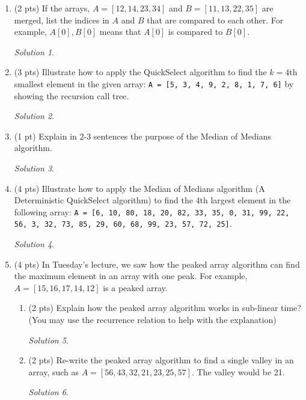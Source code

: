 \documentclass[12pt]{article}
\theoremstyle{remark}
\newtheorem*{solution}{Solution}
\begin{document}
\begin{enumerate}
\item (2 pts) If the arrays, $A=[12, 14, 23, 34]$ and $B=[11, 13, 22, 35]$ are merged, list the indices in $A$ and $B$ that are compared to each other. For example, $A[0], B[0]$ means that $A[0]$ is compared to $B[0]$.
\begin{solution}

\end{solution}

\item (3 pts) Illustrate how to apply the QuickSelect algorithm to find the $k = 4$th smallest element in the given array: \texttt{A = [5, 3, 4, 9, 2, 8, 1, 7, 6]} by showing the recursion call tree.
\begin{solution}

\end{solution}
\pagebreak
\item (1 pt) Explain in 2-3 sentences the purpose of the Median of Medians algorithm.
\begin{solution}

\end{solution}

\item (4 pts) Illustrate how to apply the Median of Medians algorithm (A Deterministic QuickSelect algorithm) to find the $4$th largest element in the following array: \texttt{A = [6, 10, 80, 18, 20, 82, 33, 35, 0, 31, 99, 22, 56, 3, 32, 73, 85, 29, 60, 68, 99, 23, 57, 72, 25]}.
\begin{solution}

\end{solution}
\pagebreak
\item (4 pts) In Tuesday's lecture, we saw how the peaked array algorithm can find the maximum element in an array with one peak. For example, $A=[15, 16, 17, 14, 12]$ is a peaked array.
\begin{enumerate}[label=(\alph*)]
\item (2 pts) Explain how the peaked array algorithm works in sub-linear time? 
(You may use the recurrence relation to help with the explanation)
\begin{solution}

\end{solution}

\item (2 pts) Re-write the peaked array algorithm to find a single valley in an array, such as $A=[56, 43, 32, 21, 23, 25, 57]$. The valley would be 21.
\begin{solution}

\end{solution}

\end{enumerate}

\end{enumerate}
\end{document}
